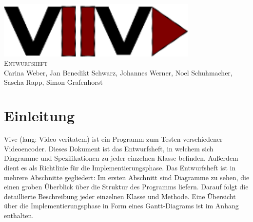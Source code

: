 \documentclass[twoside]{book}
\newcommand{\+}{\discretionary{\mbox{\scriptsize$\hookleftarrow$}}{}{}}
\newcommand{\clearemptydoublepage}{%
  \newpage{\pagestyle{empty}\cleardoublepage}%
}
\begin{document}
\hypersetup{pageanchor=false,
             bookmarks=true,
             bookmarksnumbered=true,
             pdfencoding=unicode
            }
\begin{titlepage}
\vspace*{7cm}
\begin{center}%
{\centering\includegraphics[width=10cm]{Logo.png}}\\
\vspace*{2cm}
\fontsize{40}{48} \selectfont \textsc{Entwurfsheft}\\
\vspace*{1cm}
\vspace*{0.5cm}
{\small Carina Weber, Jan Benedikt Schwarz, Johannes Werner, Noel Schuhmacher, Sascha Rapp, Simon Grafenhorst}\\
\end{center}
\end{titlepage}
\clearemptydoublepage
\tableofcontents
{}
\hypersetup{pageanchor=true}

\chapter{Einleitung}
Vive (lang: Video veritatem) ist ein Programm zum Testen verschiedener Videoencoder. Dieses Dokument ist das Entwurfsheft, in welchem sich Diagramme und Spezifikationen zu jeder einzelnen Klasse befinden. Außerdem dient es als Richtlinie für die Implementierungsphase.
Das Entwurfsheft ist in mehrere Abschnitte gegliedert: Im ersten Abschnitt sind Diagramme zu sehen, die einen groben Überblick über die Struktur des Programms liefern. Darauf folgt die detaillierte Beschreibung jeder einzelnen Klasse und Methode. Eine Übersicht über die Implementierungsphase in Form eines Gantt-Diagrams ist im Anhang enthalten.
\end{document}
